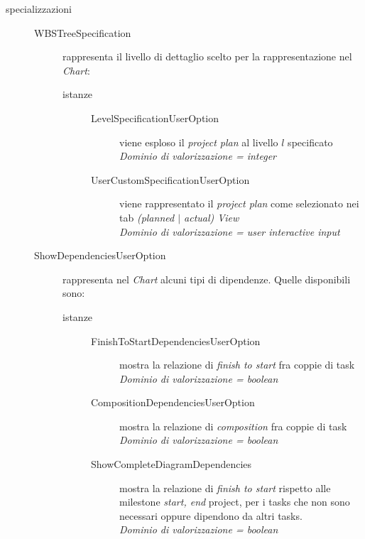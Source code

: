 \begin{description}
  \item[specializzazioni] \quad
  \begin{description}
    \item[WBSTreeSpecification] rappresenta il livello di dettaglio scelto per
    la rappresentazione nel \emph{Chart}:
	    \begin{description}
	  		\item[istanze] \quad
	  		\begin{description}
				\item[LevelSpecificationUserOption] viene esploso il \emph{project plan}
				al livello $l$ specificato
				\\ \emph{Dominio di valorizzazione = integer}
				\item[UserCustomSpecificationUserOption] viene rappresentato il
				\emph{project plan} come selezionato nei tab \emph{(planned $\mid$ actual)
				View}
				\\ \emph{Dominio di valorizzazione = user interactive input}
		  	\end{description}
	  	\end{description}

	\item[ShowDependenciesUserOption] rappresenta nel \emph{Chart} alcuni
	tipi di dipendenze. Quelle disponibili sono:
	    \begin{description}
		  \item[istanze] \quad
		  \begin{description}
			\item[FinishToStartDependenciesUserOption] mostra la relazione di
			\emph{finish to start} fra coppie di task
			\\ \emph{Dominio di valorizzazione = boolean}
			\item[CompositionDependenciesUserOption] mostra la relazione di
			\emph{composition} fra coppie di task
			\\ \emph{Dominio di valorizzazione = boolean}
			\item[ShowCompleteDiagramDependencies] mostra la relazione di \emph{finish
			to start} rispetto alle milestone \emph{start, end} project, per i
			tasks che non sono necessari oppure dipendono da altri tasks.
			\\ \emph{Dominio di valorizzazione = boolean} 
		  \end{description}
		 
		\end{description}


\end{description}
\end{description}
